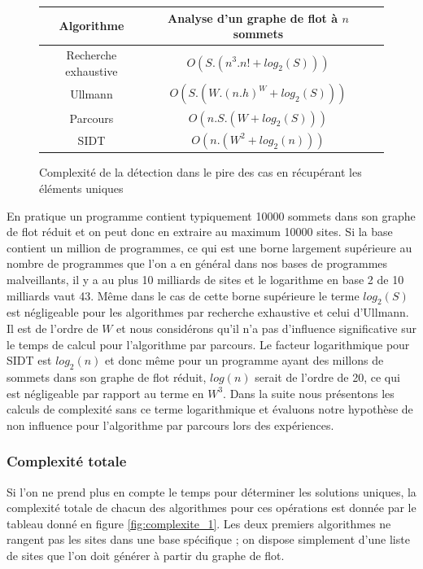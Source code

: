\begin{figure}[h]
\begin{center}
\begin{tabular}{|c|c|c|}
 \hline
 Algorithme & Analyse d'un graphe de flot à $n$ sommets\\
 \hline
 Recherche exhaustive & $O(S.(n^3.n!+log_2(S)))$\\
 Ullmann & $O(S.(W.(n.h)^W+log_2(S)))$ \\
 Parcours & $O(n.S.(W+log_2(S)))$\\
 SIDT & $O(n.(W^2+log_2(n)))$\\
 \hline
\end{tabular} 
\end{center}
\caption{Complexité de la détection dans le pire des cas en récupérant les éléments uniques}
\label{fig:complexite_unique}
\end{figure}

En pratique un programme contient typiquement 10000 sommets dans son graphe de flot réduit et on peut donc en extraire au maximum 10000 sites. Si la base contient un million de programmes, ce qui est une borne largement supérieure au nombre de programmes que l'on a en général dans nos bases de programmes malveillants, il y a au plus 10 milliards de sites et le logarithme en base 2 de 10 milliards vaut 43. Même dans le cas de cette borne supérieure le terme $log_2(S)$ est négligeable pour les algorithmes par recherche exhaustive et celui d'Ullmann. Il est de l'ordre de $W$ et nous considérons qu'il n'a pas d'influence significative sur le temps de calcul pour l'algorithme par parcours.
Le facteur logarithmique pour SIDT est $log_2(n)$ et donc même pour un programme ayant des millons de sommets dans son graphe de flot réduit, $log(n)$ serait de l'ordre de 20, ce qui est négligeable par rapport au terme en $W^3$.
Dans la suite nous présentons les calculs de complexité sans ce terme logarithmique et évaluons notre hypothèse de non influence pour l'algorithme par parcours lors des expériences.

\subsubsection{Complexité totale}
Si l'on ne prend plus en compte le temps pour déterminer les solutions uniques, la complexité totale de chacun des algorithmes pour ces opérations est donnée par le tableau donné en figure \ref{fig:complexite_1}.
Les deux premiers algorithmes ne rangent pas les sites dans une base spécifique ; on dispose simplement d'une liste de sites que l'on doit générer à partir du graphe de flot.

